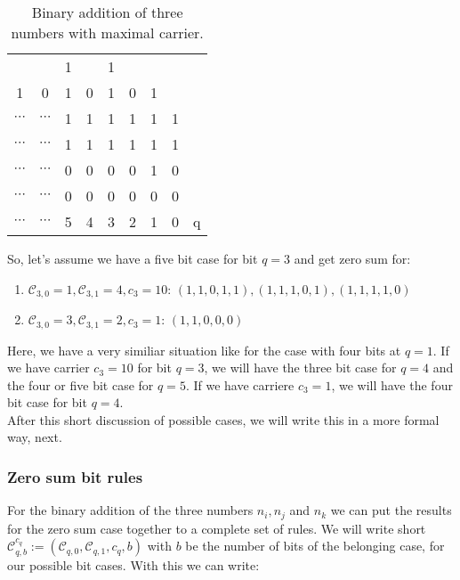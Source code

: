 \documentclass{article}
\newtheorem*{theorem A}{Theorem A}
\newtheorem*{theorem B}{N\"olker's Theorem}
\theoremstyle{remark}
\theoremstyle{remark}
\begin{document}
\begin{table}[htp]
\caption{Binary addition of three numbers with maximal carrier.}
\label{tab:binaddthreemaxcarrier}
\centering
\vspace{0.3cm}
    \begin{tabular}{ccccccccc}
         &  & 1 &  & 1 &  &  & & \\
        1 & 0 & 1 & 0 & 1 & 0 & 1 & & \\
        \hline
        $\cdots$ & $\cdots$ & 1 & 1 & 1 & 1 & 1 & 1 & \\
        $\cdots$ & $\cdots$ & 1 & 1 & 1 & 1 & 1 & 1 & \\
        $\cdots$ & $\cdots$ & 0 & 0 & 0 & 0 & 1 & 0 & \\
        \hline
        $\cdots$ & $\cdots$ & 0 & 0 & 0 & 0 & 0 & 0 & \\
        $\cdots$ & $\cdots$ & \footnotesize{5} & \footnotesize{4} & \footnotesize{3} & \footnotesize{2} & \footnotesize{1} & \footnotesize{0} & \footnotesize{q}\\
    \end{tabular}
\end{table}

So, let's assume we have a five bit case for bit $q = 3$ and get zero sum for:

\begin{enumerate}
    \item $\mathcal{C}_{3,0} = 1, \mathcal{C}_{3,1} = 4, c_{3} = 10$: $\left(1,1,0,1,1\right), \left(1,1,1,0,1\right), \left(1,1,1,1,0\right)$
    \item $\mathcal{C}_{3,0} = 3, \mathcal{C}_{3,1} = 2, c_{3} = 1$: $\left(1,1,0,0,0\right)$
\label{enum:zerosum3thbit}
\end{enumerate}

Here, we have a very similiar situation like for the case with four bits at $q = 1$. If we have carrier $c_{3} = 10$ for bit $q = 3$, we will have the three bit case for $q = 4$ and the four or five bit case for $q = 5$. If we have carriere $c_{3} = 1$, we will have the four bit case for bit $q = 4$.\\

After this short discussion of possible cases, we will write this in a more formal way, next.
\subsubsection{Zero sum bit rules}
\label{sss:zerosumbitrules}
For the binary addition of the three numbers $n_{i}, n_{j}$ and $n_{k}$ we can put the results for the zero sum case together to a complete set of rules. We will write short $\mathcal{C}^{c_{q}}_{q,b} := \left(\mathcal{C}_{q,0}, \mathcal{C}_{q,1}, c_{q}, b\right)$ with $b$ be the number of bits of the belonging case, for our possible bit cases. With this we can write:
\end{document}
